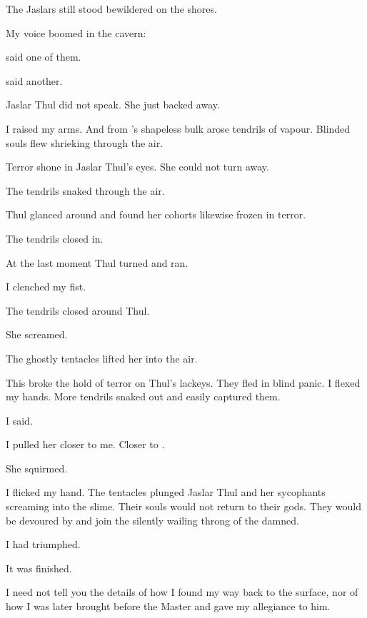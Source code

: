 \documentclass
  [a4paper,
   12pt,
   oneside
  ]%
  {article}
\begin{document}
The Jaslars still stood bewildered on the shores.

My voice boomed in the cavern:

 said one of them.

 said another.

Jaslar Thul did not speak. 
She just backed away.

I raised my arms. 
And from \Ubloth's shapeless bulk arose tendrils of vapour. 
Blinded souls flew shrieking through the air.

Terror shone in Jaslar Thul's eyes. 
She could not turn away. 

The tendrils snaked through the air. 

Thul glanced around and found her cohorts likewise frozen in terror. 

The tendrils closed in. 

At the last moment Thul turned and ran. 

I clenched my fist. 

The tendrils closed around Thul. 

She screamed. 

The ghostly tentacles lifted her into the air. 

This broke the hold of terror on Thul's lackeys. 
They fled in blind panic. 
I flexed my hands.
More tendrils snaked out and easily captured them. 

 I said.

I pulled her closer to me.
Closer to \Ubloth.

She squirmed. 


I flicked my hand.
The tentacles plunged Jaslar Thul and her sycophants screaming into the slime. 
Their souls would not return to their gods.
They would be devoured by \Ubloth and join the silently wailing throng of the damned. 

I had triumphed. 

It was finished. 

I need not tell you the details of how I found my way back to the surface, nor of how I was later brought before the Master and gave my allegiance to him.
\end{document}
